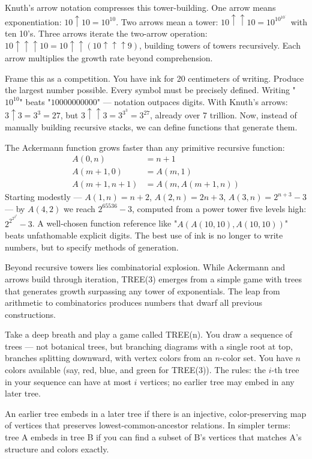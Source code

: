 Knuth's arrow notation compresses this tower-building. One arrow means exponentiation: $10 \uparrow 10 = 10^{10}$. Two arrows mean a tower: $10 \uparrow\uparrow 10 = 10^{10^{10^{\cdot^{\cdot^{\cdot}}}}}$ with ten 10's. Three arrows iterate the two-arrow operation: $10 \uparrow\uparrow\uparrow 10 = 10 \uparrow\uparrow (10 \uparrow\uparrow\uparrow 9)$, building towers of towers recursively. Each arrow multiplies the growth rate beyond comprehension.

Frame this as a competition. You have ink for 20 centimeters of writing. Produce the largest number possible. Every symbol must be precisely defined. Writing "$10^{10}$" beats "$10000000000$" — notation outpaces digits. With Knuth's arrows: $3 \uparrow 3 = 3^3 = 27$, but $3 \uparrow\uparrow 3 = 3^{3^3} = 3^{27}$, already over 7 trillion. Now, instead of manually building recursive stacks, we can define functions that generate them.

The Ackermann function grows faster than any primitive recursive function:
\[
\begin{aligned}
A(0,n) &= n+1 \\
A(m+1,0) &= A(m,1) \\
A(m+1,n+1) &= A(m, A(m+1,n))
\end{aligned}
\]
Starting modestly — $A(1,n) = n+2$, $A(2,n) = 2n+3$, $A(3,n) = 2^{n+3} - 3$ — by $A(4,2)$ we reach $2^{65536} - 3$, computed from a power tower five levels high: $2^{2^{2^{2^2}}} - 3$. A well-chosen function reference like "$A(A(10,10),A(10,10))$" beats unfathomable explicit digits. The best use of ink is no longer to write numbers, but to specify methods of generation.

Beyond recursive towers lies combinatorial explosion. While Ackermann and arrows build through iteration, TREE(3) emerges from a simple game with trees that generates growth surpassing any tower of exponentials. The leap from arithmetic to combinatorics produces numbers that dwarf all previous constructions.

Take a deep breath and play a game called TREE(n). You draw a sequence of trees — not botanical trees, but branching diagrams with a single root at top, branches splitting downward, with vertex colors from an $n$-color set. You have $n$ colors available (say, red, blue, and green for TREE(3)). The rules: the $i$-th tree in your sequence can have at most $i$ vertices; no earlier tree may embed in any later tree.

An earlier tree embeds in a later tree if there is an injective, color-preserving map of vertices that preserves lowest-common-ancestor relations. In simpler terms: tree A embeds in tree B if you can find a subset of B's vertices that matches A's structure and colors exactly.

